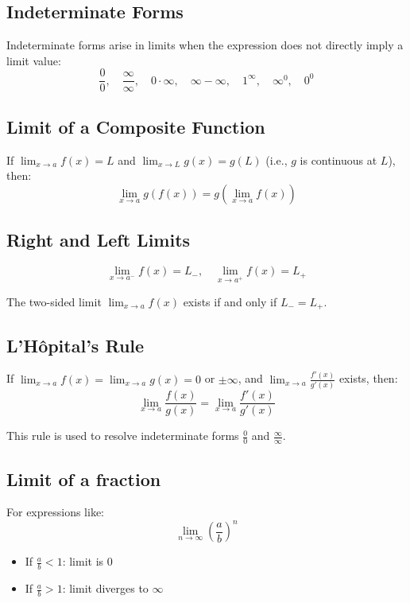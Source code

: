 \subsection{Indeterminate Forms}

Indeterminate forms arise in limits when the expression does not directly imply a limit value:
\[
\frac{0}{0}, \quad \frac{\infty}{\infty}, \quad 0 \cdot \infty, \quad \infty - \infty, \quad 1^\infty, \quad \infty^0, \quad 0^0
\]

\subsection{Limit of a Composite Function}

If \(\displaystyle \lim_{x \to a} f(x) = L\) and \(\displaystyle \lim_{x \to L} g(x) = g(L)\) (i.e., \(g\) is continuous at \(L\)), then:
\[
\lim_{x \to a} g(f(x)) = g\left(\lim_{x \to a} f(x)\right)
\]

\subsection{Right and Left Limits}

\[
\lim_{x \to a^-} f(x) = L_-, \quad \lim_{x \to a^+} f(x) = L_+
\]

The two-sided limit \(\displaystyle \lim_{x \to a} f(x)\) exists if and only if \(L_- = L_+\).

\subsection{L’Hôpital’s Rule}

If \(\displaystyle \lim_{x \to a} f(x) = \lim_{x \to a} g(x) = 0\) or \(\pm\infty\), and \(\displaystyle \lim_{x \to a} \frac{f'(x)}{g'(x)}\) exists, then:
\[
\lim_{x \to a} \frac{f(x)}{g(x)} = \lim_{x \to a} \frac{f'(x)}{g'(x)}
\]

This rule is used to resolve indeterminate forms \(\frac{0}{0}\) and \(\frac{\infty}{\infty}\).

\subsection{Limit of a fraction}

For expressions like:
\[
\lim_{n \to \infty} \left( \frac{a}{b} \right)^n
\]
\begin{itemize}[label=\(-\)]
\item If \(\frac{a}{b} < 1\): limit is \(0\)
\item If \(\frac{a}{b} > 1\): limit diverges to \(\infty\)
\end{itemize}

